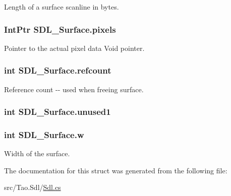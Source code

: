 Length of a surface scanline in bytes. 

\hypertarget{struct_s_d_l___surface_aec4109250396885d55724d1d90493af8}{
\subsubsection[{pixels}]{\setlength{\rightskip}{0pt plus 5cm}IntPtr {\bf SDL\_\-Surface.pixels}}}
\label{struct_s_d_l___surface_aec4109250396885d55724d1d90493af8}


Pointer to the actual pixel data Void pointer. 

\hypertarget{struct_s_d_l___surface_a3bc1f5a9735f4eadd6a9f5c149f3afd5}{
\subsubsection[{refcount}]{\setlength{\rightskip}{0pt plus 5cm}int {\bf SDL\_\-Surface.refcount}}}
\label{struct_s_d_l___surface_a3bc1f5a9735f4eadd6a9f5c149f3afd5}


Reference count -\/-\/ used when freeing surface. 

\hypertarget{struct_s_d_l___surface_a1a935a28ce9c4367f21ca1c93e1fa510}{
\subsubsection[{unused1}]{\setlength{\rightskip}{0pt plus 5cm}int {\bf SDL\_\-Surface.unused1}}}
\label{struct_s_d_l___surface_a1a935a28ce9c4367f21ca1c93e1fa510}
\hypertarget{struct_s_d_l___surface_ae80caa4de3b72895c314a9a7b099149a}{
\subsubsection[{w}]{\setlength{\rightskip}{0pt plus 5cm}int {\bf SDL\_\-Surface.w}}}
\label{struct_s_d_l___surface_ae80caa4de3b72895c314a9a7b099149a}


Width of the surface. 



The documentation for this struct was generated from the following file:\begin{DoxyCompactItemize}
\item 
src/Tao.Sdl/\hyperlink{_sdl_8cs}{Sdl.cs}\end{DoxyCompactItemize}
